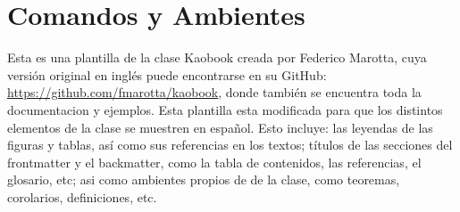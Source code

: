 \setchapterpreamble[u]{\margintoc}
\chapter[Comandos y Ambientes]{Comandos y Ambientes\footnotemark[0]}


Esta es una plantilla de la clase Kaobook creada por Federico Marotta, cuya versión original en inglés puede encontrarse en su GitHub: \url{https://github.com/fmarotta/kaobook}, donde también se encuentra toda la documentacion y ejemplos. Esta plantilla esta modificada para que los distintos elementos de la clase se muestren en español. Esto incluye: las leyendas de las figuras y tablas, así como sus referencias en los textos; títulos de las secciones del frontmatter y el backmatter, como la tabla de contenidos, las referencias, el glosario, etc; asi como ambientes propios de de la clase, como teoremas, corolarios, definiciones, etc.

